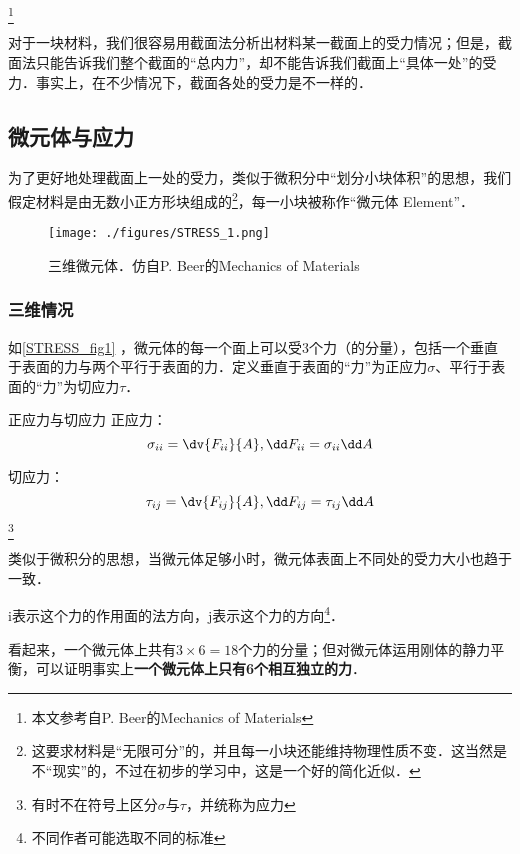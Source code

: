 
\begin{issues}
\issueDraft
\issueTODO
\end{issues}

\footnote{本文参考自P. Beer的Mechanics of Materials}

对于一块材料，我们很容易用截面法分析出材料某一截面上的受力情况；但是，截面法只能告诉我们整个截面的“总内力”，却不能告诉我们截面上“具体一处”的受力．事实上，在不少情况下，截面各处的受力是不一样的．

\subsection{微元体与应力}
为了更好地处理截面上一处的受力，类似于微积分中“划分小块体积”的思想，我们假定材料是由无数小正方形块组成的\footnote{这要求材料是“无限可分”的，并且每一小块还能维持物理性质不变．这当然是不“现实”的，不过在初步的学习中，这是一个好的简化近似．}，每一小块被称作“微元体 Element”．

\begin{figure}[ht]
\centering
\texttt{[image: ./figures/STRESS\_1.png]}
\caption{三维微元体．仿自P. Beer的Mechanics of Materials} \label{STRESS_fig1}
\end{figure}

\subsubsection{三维情况}
如\autoref{STRESS_fig1} ，微元体的每一个面上可以受3个力（的分量），包括一个垂直于表面的力与两个平行于表面的力．定义垂直于表面的“力”为正应力$\sigma$、平行于表面的“力”为切应力$\tau$．

\begin{definition}{正应力与切应力}
正应力：$$\sigma_{ii} =\dv{F_{ii}}{A}, \dd F_{ii} = \sigma_{ii} \dd A$$

切应力：$$\tau_{ij}=\dv{F_{ij}}{A}, \dd F_{ij} = \tau_{ij} \dd A$$
\footnote{有时不在符号上区分$\sigma$与$\tau$，并统称为应力}

类似于微积分的思想，当微元体足够小时，微元体表面上不同处的受力大小也趋于一致．

i表示这个力的作用面的法方向，j表示这个力的方向\footnote{不同作者可能选取不同的标准}．
\end{definition}

看起来，一个微元体上共有$3\times6=18$个力的分量；但对微元体运用刚体的静力平衡，可以证明事实上\textbf{一个微元体上只有6个相互独立的力}．

